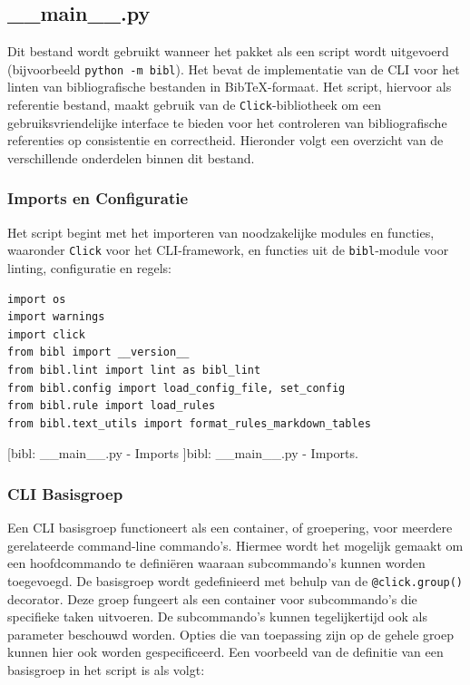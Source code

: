 \subsection{\_\_main\_\_.py}
Dit bestand wordt gebruikt wanneer het pakket als een script wordt uitgevoerd (bijvoorbeeld \texttt{python -m bibl}). Het bevat de implementatie van de \acrfull{CLI} voor het linten van bibliografische bestanden in BibTeX-formaat. Het script, hiervoor als referentie bestand, maakt gebruik van de \texttt{Click}-bibliotheek om een gebruiksvriendelijke interface te bieden voor het controleren van bibliografische referenties op consistentie en correctheid. Hieronder volgt een overzicht van de verschillende onderdelen binnen dit bestand.

\subsubsection{Imports en Configuratie}

Het script begint met het importeren van noodzakelijke modules en functies, waaronder \texttt{Click} voor het \acrshort{CLI}-framework, en functies uit de \texttt{bibl}-module voor linting, configuratie en regels:

\begin{verbatim}
import os
import warnings
import click
from bibl import __version__
from bibl.lint import lint as bibl_lint
from bibl.config import load_config_file, set_config
from bibl.rule import load_rules
from bibl.text_utils import format_rules_markdown_tables
\end{verbatim}
[bibl: \_\_main\_\_.py - Imports ]{bibl: \_\_main\_\_.py - Imports. \label{lst:bibl_main_imports}}

\subsubsection{\acrshort{CLI} Basisgroep}

Een \acrshort{CLI} basisgroep functioneert als een container, of groepering, voor meerdere gerelateerde command-line commando's. Hiermee wordt het mogelijk gemaakt om een hoofdcommando te definiëren waaraan subcommando's kunnen worden toegevoegd.
De basisgroep wordt gedefinieerd met behulp van de \texttt{@click.group()} decorator. Deze groep fungeert als een container voor subcommando's die specifieke taken uitvoeren. De subcommando's kunnen tegelijkertijd ook als parameter beschouwd worden. Opties die van toepassing zijn op de gehele groep kunnen hier ook worden gespecificeerd. Een voorbeeld van de definitie van een basisgroep in het script is als volgt:

